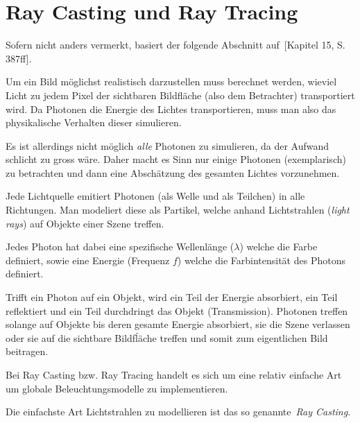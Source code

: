\section{Ray Casting und Ray Tracing}
\label{sec:ray_casting_tracing}

Sofern nicht anders vermerkt, basiert der folgende Abschnitt
auf~\cite{hughes_computer_2013}[Kapitel 15, S. 387ff].

Um ein Bild möglichst realistisch darzustellen muss berechnet werden, wieviel
Licht zu jedem Pixel der sichtbaren Bildfläche (also dem Betrachter)
transportiert wird. Da Photonen die Energie des Lichtes transportieren, muss
man also das physikalische Verhalten dieser simulieren.

Es ist allerdings nicht möglich \textit{alle} Photonen zu simulieren, da
der Aufwand schlicht zu gross wäre. Daher macht es Sinn nur einige
Photonen (exemplarisch) zu betrachten und dann eine Abschätzung des
gesamten Lichtes vorzunehmen.

Jede Lichtquelle emitiert Photonen (als Welle und als Teilchen) in alle
Richtungen. Man modeliert diese als Partikel, welche anhand
Lichtstrahlen (\textit{light rays}) auf Objekte einer
Szene treffen.

Jedes Photon hat dabei eine spezifische Wellenlänge ($\lambda{}$) welche
die Farbe definiert, sowie eine Energie (Frequenz $f$) welche die
Farbintensität des Photons definiert.

Trifft ein Photon auf ein Objekt, wird ein Teil der Energie absorbiert,
ein Teil reflektiert und ein Teil durchdringt das Objekt (Transmission).
Photonen treffen solange auf Objekte bis deren gesamte Energie
absorbiert, sie die Szene verlassen oder sie auf die sichtbare
Bildfĺäche treffen und somit zum eigentlichen Bild beitragen.

Bei Ray Casting bzw. Ray Tracing handelt es sich um eine relativ
einfache Art um globale Beleuchtungsmodelle zu implementieren.

Die einfachste Art Lichtstrahlen zu modellieren ist das so
genannte~\textit{Ray Casting}.



